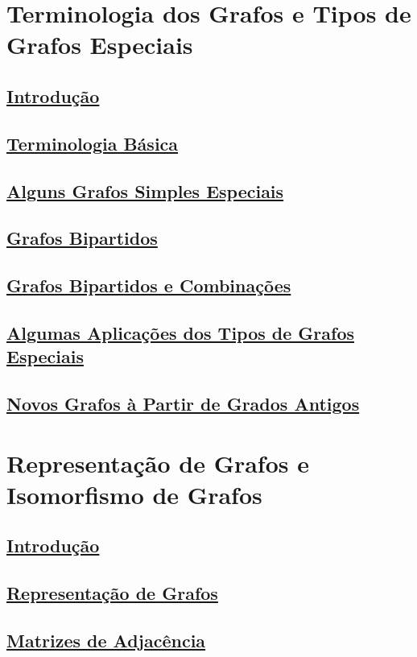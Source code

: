 \section{Terminologia dos Grafos e Tipos de Grafos Especiais}
\subsection*{\underline{Introdução}}
\subsection*{\underline{Terminologia Básica}}
\subsection*{\underline{Alguns Grafos Simples Especiais}}
\subsection*{\underline{Grafos Bipartidos}}
\subsection*{\underline{Grafos Bipartidos e Combinações}}
\subsection*{\underline{Algumas Aplicações dos Tipos de Grafos Especiais}}
\subsection*{\underline{Novos Grafos à Partir de Grados Antigos}}

\section{Representação de Grafos e Isomorfismo de Grafos}
\subsection*{\underline{Introdução}}
\subsection*{\underline{Representação de Grafos}}
\subsection*{\underline{Matrizes de Adjacência}}

